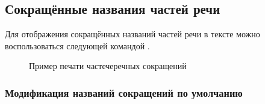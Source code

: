 \subsection{Сокращённые названия частей речи}

Для отображения сокращённых названий частей речи в тексте можно воспользоваться следующей командой
\rsName[rsShowAcr].




\begin{figure}[H]
    \centering
    \begin{minipage}[c]{0.5\textwidth}
        \begin{Latexcode}
             
            \newline
             
            \newline
             
        \end{Latexcode}
    \end{minipage}
    \hfill
    \begin{minipage}[c]{0.4\textwidth}
        \small
         
        \newline
         
        \newline
         
    \end{minipage}

    \caption{Пример печати частечеречных сокращений}
\end{figure}


\subsubsection{Модификация названий сокращений по умолчанию}


